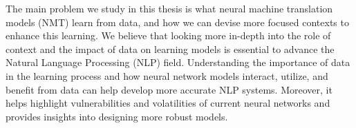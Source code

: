 \medskip

The main problem we study in this thesis is what neural machine translation models (NMT) learn from data, and how we can devise more focused contexts to enhance this learning.
We believe that looking more in-depth into the role of context and the impact of data on learning models is essential to advance the Natural Language Processing (NLP) field. 
Understanding the importance of data in the learning process and how neural network models interact, utilize, and benefit from data can help develop more {accurate} NLP systems. 
Moreover, it helps highlight vulnerabilities and volatilities of current neural networks and provides insights into designing more  robust models.










